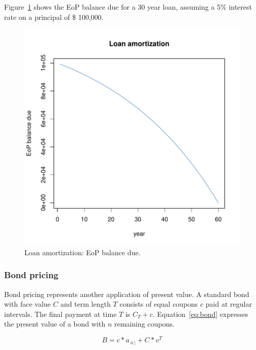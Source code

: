 \documentclass[nojss]{jss}
\begin{document}
Figure~\ref{fig:LoanAmort} shows the EoP balance due for a 30 year loan, assuming a 5\% interest rate on a principal of \$ 100,000. 

\begin{figure}
\begin{center}
\includegraphics{an_introduction_to_lifecontingencies_package-figBalanceDue}
\caption{Loan amortization: EoP balance due.}
\label{fig:LoanAmort}
\end{center}
\end{figure}


\subsubsection{Bond pricing}\label{sss:finbond}

Bond pricing represents another application of present value. A standard bond
with face value $C$ and term length $T$ consists of
equal coupons $c$ paid at regular intervals. The final payment at time $T$ is 
$C_T + c$.
Equation~\ref{eq:bond} expresses the present value of a bond with $n$ remaining
coupons.

\begin{equation}
B = {c}*{a}_{\left. {\overline {\, n \,}}\! \right| } + {C}*{v^{T}}
	\label{eq:bond}
\end{equation}
\end{document}

